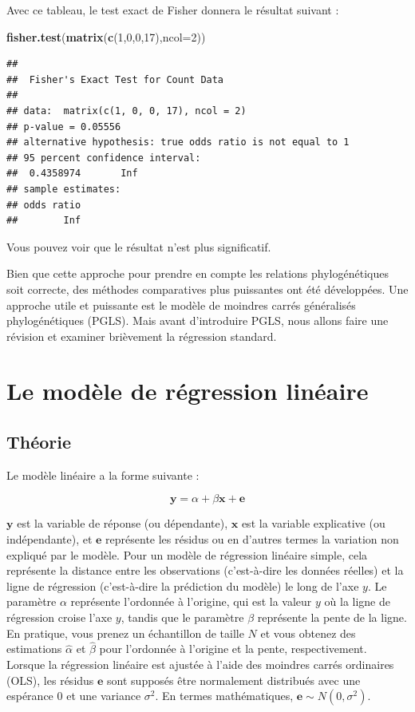 \documentclass[
]{book}
\newenvironment{Shaded}{\begin{snugshade}}{\end{snugshade}}
\newcommand{\AttributeTok}[1]{\textcolor[rgb]{0.13,0.29,0.53}{#1}}
\newcommand{\DecValTok}[1]{\textcolor[rgb]{0.00,0.00,0.81}{#1}}
\newcommand{\FunctionTok}[1]{\textcolor[rgb]{0.13,0.29,0.53}{\textbf{#1}}}
\newcommand{\NormalTok}[1]{#1}
\begin{document}
Avec ce tableau, le test exact de Fisher donnera le résultat suivant :

\begin{Shaded}
\begin{Highlighting}[]
\FunctionTok{fisher.test}\NormalTok{(}\FunctionTok{matrix}\NormalTok{(}\FunctionTok{c}\NormalTok{(}\DecValTok{1}\NormalTok{,}\DecValTok{0}\NormalTok{,}\DecValTok{0}\NormalTok{,}\DecValTok{17}\NormalTok{),}\AttributeTok{ncol=}\DecValTok{2}\NormalTok{))}
\end{Highlighting}
\end{Shaded}

\begin{verbatim}
## 
##  Fisher's Exact Test for Count Data
## 
## data:  matrix(c(1, 0, 0, 17), ncol = 2)
## p-value = 0.05556
## alternative hypothesis: true odds ratio is not equal to 1
## 95 percent confidence interval:
##  0.4358974       Inf
## sample estimates:
## odds ratio 
##        Inf
\end{verbatim}

Vous pouvez voir que le résultat n'est plus significatif.

Bien que cette approche pour prendre en compte les relations phylogénétiques soit correcte, des méthodes comparatives plus puissantes ont été développées. Une approche utile et puissante est le modèle de moindres carrés généralisés phylogénétiques (PGLS). Mais avant d'introduire PGLS, nous allons faire une révision et examiner brièvement la régression standard.

\chapter{Le modèle de régression linéaire}\label{linear-regression}

\section{Théorie}\label{thuxe9orie}

Le modèle linéaire a la forme suivante :

\[\textbf{y} = \alpha + \beta \textbf{x} + \textbf{e}\]

\(\textbf{y}\) est la variable de réponse (ou dépendante), \(\textbf{x}\) est la variable explicative (ou indépendante), et \(\textbf{e}\) représente les résidus ou en d'autres termes la variation non expliqué par le modèle. Pour un modèle de régression linéaire simple, cela représente la distance entre les observations (c'est-à-dire les données réelles) et la ligne de régression (c'est-à-dire la prédiction du modèle) le long de l'axe \(y\). Le paramètre \(\alpha\) représente l'ordonnée à l'origine, qui est la valeur \(y\) où la ligne de régression croise l'axe \(y\), tandis que le paramètre \(\beta\) représente la pente de la ligne. En pratique, vous prenez un échantillon de taille \(N\) et vous obtenez des estimations \(\hat{\alpha}\) et \(\hat{\beta}\) pour l'ordonnée à l'origine et la pente, respectivement. Lorsque la régression linéaire est ajustée à l'aide des moindres carrés ordinaires (OLS), les résidus \(\textbf{e}\) sont supposés être normalement distribués avec une espérance \(0\) et une variance \(\sigma^2\). En termes mathématiques, \(\textbf{e} \sim N(0,\sigma^2)\).
\end{document}
